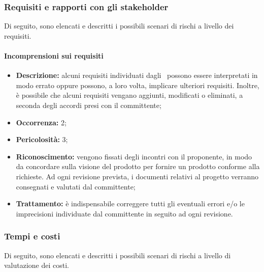 \subsubsection{Requisiti e rapporti con gli stakeholder}

Di seguito, sono elencati e descritti i possibili scenari di rischi a livello dei requisiti.

\paragraph{Incomprensioni sui requisiti}
\begin{itemize}
	\item \textbf{Descrizione:} alcuni requisiti individuati dagli \textit{\Anas}\ possono essere interpretati in modo errato oppure possono, a loro volta, implicare ulteriori requisiti. Inoltre, è possibile che alcuni requisiti vengano aggiunti, modificati o eliminati, a seconda degli accordi presi con il committente;
	\item \textbf{Occorrenza:} 2;
	\item \textbf{Pericolosità:} 3;
	\item \textbf{Riconoscimento:} vengono fissati degli incontri con il proponente, in modo da concordare sulla visione del prodotto per fornire un prodotto conforme alla richieste. Ad ogni revisione prevista, i documenti relativi al progetto verranno consegnati e valutati dal committente;
	\item \textbf{Trattamento:} è indispensabile correggere tutti gli eventuali errori e/o le imprecisioni individuate dal committente in seguito ad ogni revisione.
\end{itemize}

\subsubsection{Tempi e costi}

Di seguito, sono elencati e descritti i possibili scenari di rischi a livello di valutazione dei costi.

